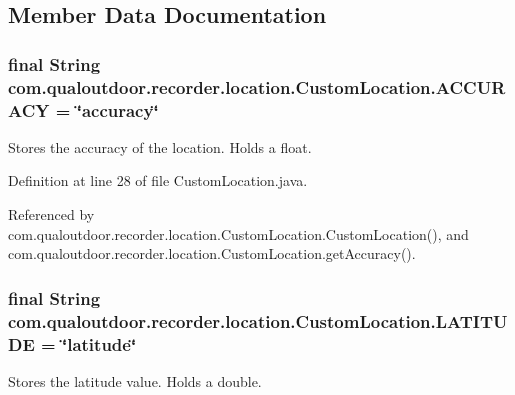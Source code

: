 \subsection{Member Data Documentation}
\hypertarget{classcom_1_1qualoutdoor_1_1recorder_1_1location_1_1CustomLocation_a291960c31ad50b5224edbeb9a97b6a27}{
\subsubsection[{A\-C\-C\-U\-R\-A\-C\-Y}]{\setlength{\rightskip}{0pt plus 5cm}final String com.\-qualoutdoor.\-recorder.\-location.\-Custom\-Location.\-A\-C\-C\-U\-R\-A\-C\-Y = \char`\"{}accuracy\char`\"{}\hspace{0.3cm}{\ttfamily [static]}}}\label{classcom_1_1qualoutdoor_1_1recorder_1_1location_1_1CustomLocation_a291960c31ad50b5224edbeb9a97b6a27}
Stores the accuracy of the location. Holds a float. 

Definition at line 28 of file Custom\-Location.\-java.



Referenced by com.\-qualoutdoor.\-recorder.\-location.\-Custom\-Location.\-Custom\-Location(), and com.\-qualoutdoor.\-recorder.\-location.\-Custom\-Location.\-get\-Accuracy().

\hypertarget{classcom_1_1qualoutdoor_1_1recorder_1_1location_1_1CustomLocation_a96a2dd85b090a1a1ec5958b707a5bf73}{
\subsubsection[{L\-A\-T\-I\-T\-U\-D\-E}]{\setlength{\rightskip}{0pt plus 5cm}final String com.\-qualoutdoor.\-recorder.\-location.\-Custom\-Location.\-L\-A\-T\-I\-T\-U\-D\-E = \char`\"{}latitude\char`\"{}\hspace{0.3cm}{\ttfamily [static]}}}\label{classcom_1_1qualoutdoor_1_1recorder_1_1location_1_1CustomLocation_a96a2dd85b090a1a1ec5958b707a5bf73}
Stores the latitude value. Holds a double. 

